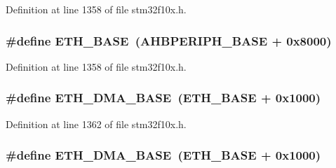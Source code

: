 Definition at line 1358 of file stm32f10x.\+h.

\subsubsection[{\texorpdfstring{E\+T\+H\+\_\+\+B\+A\+SE}{ETH_BASE}}]{\setlength{\rightskip}{0pt plus 5cm}\#define E\+T\+H\+\_\+\+B\+A\+SE~({\bf A\+H\+B\+P\+E\+R\+I\+P\+H\+\_\+\+B\+A\+SE} + 0x8000)}\hypertarget{group___peripheral__memory__map_gad965a7b1106ece575ed3da10c45c65cc}{}\label{group___peripheral__memory__map_gad965a7b1106ece575ed3da10c45c65cc}


Definition at line 1358 of file stm32f10x.\+h.

\subsubsection[{\texorpdfstring{E\+T\+H\+\_\+\+D\+M\+A\+\_\+\+B\+A\+SE}{ETH_DMA_BASE}}]{\setlength{\rightskip}{0pt plus 5cm}\#define E\+T\+H\+\_\+\+D\+M\+A\+\_\+\+B\+A\+SE~({\bf E\+T\+H\+\_\+\+B\+A\+SE} + 0x1000)}\hypertarget{group___peripheral__memory__map_gace2114e1b37c1ba88d60f3e831b67e93}{}\label{group___peripheral__memory__map_gace2114e1b37c1ba88d60f3e831b67e93}


Definition at line 1362 of file stm32f10x.\+h.

\subsubsection[{\texorpdfstring{E\+T\+H\+\_\+\+D\+M\+A\+\_\+\+B\+A\+SE}{ETH_DMA_BASE}}]{\setlength{\rightskip}{0pt plus 5cm}\#define E\+T\+H\+\_\+\+D\+M\+A\+\_\+\+B\+A\+SE~({\bf E\+T\+H\+\_\+\+B\+A\+SE} + 0x1000)}\hypertarget{group___peripheral__memory__map_gace2114e1b37c1ba88d60f3e831b67e93}{}\label{group___peripheral__memory__map_gace2114e1b37c1ba88d60f3e831b67e93}


